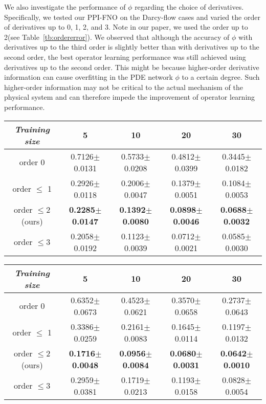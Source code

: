 {We also investigate the performance of $\phi$ regarding the choice of derivatives. Specifically, we tested our PPI-FNO on the Darcy-flow cases and varied the order of derivatives up to 0, 1, 2, and 3. Note in our paper, we used the order up to 2(see Table~\ref{tb:ordererror}). We observed that although the accuracy of $\phi$ with derivatives up to the third order is slightly better than with derivatives up to the second order, the best operator learning performance was still achieved using derivatives up to the second order. This might be because higher-order derivative information can cause overfitting in the PDE network $\phi$ to a certain degree. Such higher-order information may not be critical to the actual mechanism of the physical system and can therefore impede the improvement of operator learning performance.

\begin{table*}[t]
\small
\centering
\begin{subtable}{\textwidth}
   \small
    \centering
    \begin{tabular}{ccccc}
    \hline \textit{Training size} & 5 & 10 & 20 & 30 \\
    \hline
    order 0 & 0.7126$\pm$0.0131 & 0.5733$\pm$0.0208 & 0.4812$\pm$0.0399 & 0.3445$\pm$0.0182 \\ 
    order $\le$ 1 & 0.2926$\pm$0.0118 & 0.2006$\pm$0.0047 & 0.1379$\pm$0.0051 & 0.1084$\pm$0.0053 \\ 
    order $\le 2$ (ours) & \textbf{0.2285$\pm$0.0147} & \textbf{0.1392$\pm$0.0080} & \textbf{0.0898$\pm$0.0046} & \textbf{0.0688$\pm$0.0032} \\ 
    order $\le 3$ & 0.2058$\pm$0.0192 & 0.1123$\pm$0.0039 & 0.0712$\pm$0.0021 & 0.0585$\pm$0.0030 \\ 
    \hline
    \end{tabular}
    \caption{\small The error of black-box PDE network $\phi$ (i.e., $u\rightarrow f$)}
\end{subtable}
\begin{subtable}{\textwidth}
   \small
    \centering
    \begin{tabular}{ccccc}
    \hline \textit{Training size} & 5 & 10 & 20 & 30 \\
    \hline
    order 0 & 0.6352$\pm$0.0673 & 0.4523$\pm$0.0621 & 0.3570$\pm$0.0658 & 0.2737$\pm$0.0643 \\ 
    order $\le$ 1 & 0.3386$\pm$0.0259 & 0.2161$\pm$0.0083 & 0.1645$\pm$0.0114 & 0.1197$\pm$0.0132 \\ 
    order $\le 2$ (ours) & \textbf{0.1716$\pm$0.0048} & \textbf{0.0956$\pm$0.0084} & \textbf{0.0680$\pm$0.0031} & \textbf{0.0642$\pm$0.0010} \\ 
    order $\le 3$ & 0.2959$\pm$0.0381 & 0.1719$\pm$0.0213 & 0.1193$\pm$0.0158 & 0.0828$\pm$0.0054 \\ 
    \hline
    \end{tabular}
    \caption{\small The corresponding operator learning error (i.e., $f \rightarrow u$)}
\end{subtable}
\caption{\small The relative $L_2$ error in predicting $f$ of each order } \label{tb:ordererror}
\end{table*}
}


